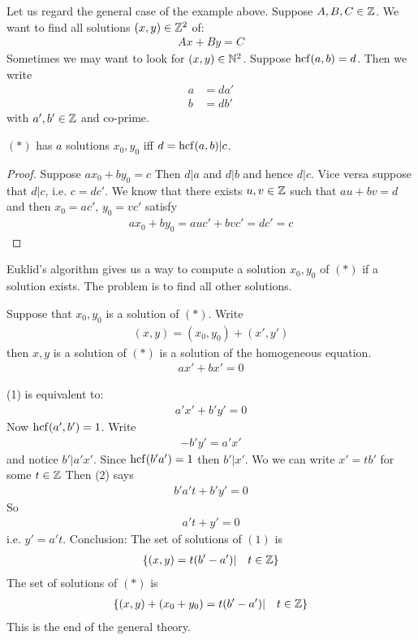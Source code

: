 Let us regard the general case of the example above.
Suppose $A,B,C \in \mathbb Z$. We want to find all solutions $(x,y) \in \mathbb Z^2$ of:
\begin{align*}
Ax + By =C \tag{*}
\end{align*}
Sometimes we may want to look for $(x,y) \in \mathbb N^2$. 
Suppose $\operatorname{hcf}(a,b) = d$. Then we write 
\begin{align*}
a & = d a'\\
b & = db'
\end{align*}
with $a', b' \in \mathbb Z$ and co-prime.

\begin{rk}
$(*)$ has $a$ solutions $x_0,y_0$ iff $d = \operatorname{hcf}(a,b) | c$.
\end{rk}  
\begin{proof}
Suppose $ax_0 + by_0 = c$ Then $d|a$ and $d|b$ and hence $d|c$.
Vice versa suppose that $d|c$, i.e. $c =dc'$. We know that there exists $u,v \in \mathbb Z$ such that $au + bv = d$ and then $x_0 = ac'$, $y_0 = vc'$ satisfy
\begin{align*}
ax_0 + by_0 = auc' + bvc' = dc' = c
\end{align*} 
\end{proof}
\begin{rk}
Euklid's algorithm gives us a way to compute a solution $x_0, y_0$ of $(*)$ if a solution exists. The problem is to find all other solutions.
\end{rk}


Suppose that $x_0, y_0$ is a solution of $(*)$. Write 
\begin{align*}
(x,y) = (x_0, y_0) + (x',y')
\end{align*}
then $x,y$ is a solution of $(*)$ is a solution of the homogeneous equation.
\begin{align*}
ax' + bx' = 0 \tag{1}
\end{align*}

(1) is equivalent to:
\begin{align*}
a'x' + b'y' = 0 \tag{2}
\end{align*}
Now $\operatorname{hcf}(a', b')= 1$.
Write 
\begin{align*}
-b'y' = a'x'
\end{align*}
and notice $b'|a'x'$. Since $\operatorname{hcf}(b'a')= 1$ then $b'|x'$. Wo we can write $x' = tb'$ for some $t \in \mathbb Z$ Then (2) says
\begin{align*}
b'a't+b'y' = 0
\end{align*}
So 
\begin{align*}
a't + y' = 0
\end{align*}
i.e. $y' = a' t$. 
Conclusion:
The set of solutions of $(1)$ is
\begin{align*}
\{(x,y) = t(b'-a')|\quad t \in \mathbb Z \}
\end{align*}
The set of solutions of $(*)$ is 
\begin{align*}
\{(x,y) + (x_0+ y_0) = t(b'-a')| \quad t \in \mathbb Z \}
\end{align*}
This is the end of the general theory.

